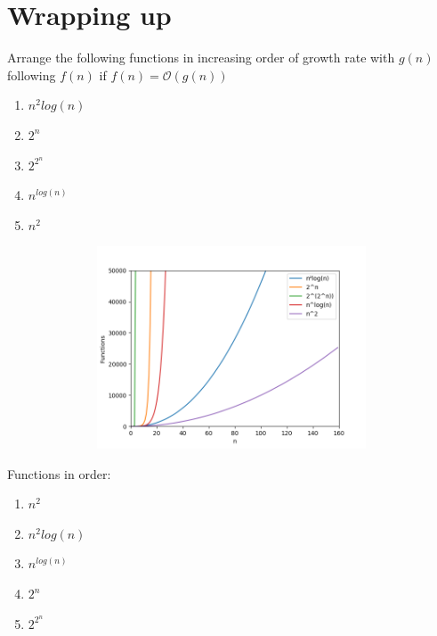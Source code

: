 \documentclass[12pt]{article}
\begin{document}
\section{Wrapping up}

Arrange the following functions in increasing order of growth rate with $g(n)$ following $f(n)$ if $f(n) = \mathcal{O}(g(n))$

\begin{enumerate}
    \item $n^{2}log(n)$
    \item $2^{n}$
    \item $2^{2^{n}}$
    \item $n^{log(n)}$
    \item $n^{2}$
\end{enumerate}

\begin{center}
\includegraphics[width=15cm, height=6cm]{img/Figure_1.png}
\end{center}

Functions in order:

\begin{enumerate}
    \item $n^{2}$
    \item $n^{2}log(n)$
    \item $n^{log(n)}$
    \item $2^{n}$
    \item $2^{2^{n}}$
\end{enumerate}
\end{document}
